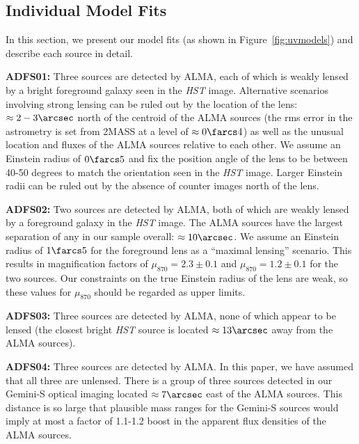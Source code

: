 \documentclass[iop]{emulateapj}
\begin{document}
\subsection{Individual Model Fits}\label{sec:objectbyobject}

In this section, we present our model fits (as shown in
Figure~\ref{fig:uvmodels}) and describe each source in detail.

{\bf ADFS01:} Three sources are detected by ALMA, each of which is weakly
lensed by a bright foreground galaxy seen in the {\it HST} image.  Alternative
scenarios involving strong lensing can be ruled out by the location of the
lens: $\approx 2-3\arcsec$ north of the centroid of the ALMA sources (the rms
error in the astrometry is set from 2MASS at a level of $\approx 0\farcs4$) as
well as the unusual location and fluxes of the ALMA sources relative to each
other.  We assume an Einstein radius of $0\farcs5$ and fix the position angle
of the lens to be between 40-50 degrees to match the orientation seen in the
{\it HST} image.  Larger Einstein radii can be ruled out by the absence of
counter images north of the lens.

{\bf ADFS02:} Two sources are detected by ALMA, both of which are weakly lensed
by a foreground galaxy in the {\it HST} image.  The ALMA sources have the
largest separation of any in our sample overall: $\approx 10\arcsec$.  We
assume an Einstein radius of $1\farcs5$ for the foreground lens as a ``maximal
lensing'' scenario.  This results in magnification factors of $\mu_{870} = 2.3
\pm 0.1$ and $\mu_{870} = 1.2 \pm 0.1$ for the two sources.  Our constraints on
the true Einstein radius of the lens are weak, so these values for $\mu_{870}$
should be regarded as upper limits.

{\bf ADFS03:} Three sources are detected by ALMA, none of which appear to be
lensed (the closest bright {\it HST} source is located $\approx 13\arcsec$ away
from the ALMA sources).

{\bf ADFS04:} Three sources are detected by ALMA.  In this paper, we have
assumed that all three are unlensed.  There is a group of three sources
detected in our Gemini-S optical imaging located $\approx 7\arcsec$ east of the
ALMA sources.  This distance is so large that plausible mass ranges for the
Gemini-S sources would imply at most a factor of 1.1-1.2 boost in the apparent
flux densities of the ALMA sources.
\end{document}
